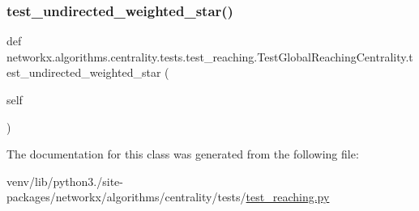 \subsubsection{\texorpdfstring{test\+\_\+undirected\+\_\+weighted\+\_\+star()}{test\_undirected\_weighted\_star()}}
{\footnotesize\ttfamily def networkx.\+algorithms.\+centrality.\+tests.\+test\+\_\+reaching.\+Test\+Global\+Reaching\+Centrality.\+test\+\_\+undirected\+\_\+weighted\+\_\+star (\begin{DoxyParamCaption}\item[{}]{self }\end{DoxyParamCaption})}



The documentation for this class was generated from the following file\+:\begin{DoxyCompactItemize}
\item 
venv/lib/python3./site-\/packages/networkx/algorithms/centrality/tests/\hyperlink{test__reaching_8py}{test\+\_\+reaching.\+py}\end{DoxyCompactItemize}
